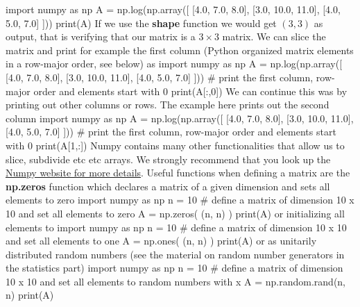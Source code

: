 \documentclass[%
oneside,                 %
final,                   %
10pt]{article}
\begin{document}
\bpycod
import numpy as np
A = np.log(np.array([ [4.0, 7.0, 8.0], [3.0, 10.0, 11.0], [4.0, 5.0, 7.0] ]))
print(A)
\epycod
If we use the \textbf{shape} function we would get $(3, 3)$ as output, that is verifying that our matrix is a $3\times 3$ matrix. We can slice the matrix and print for example the first column (Python organized matrix elements in a row-major order, see below) as
\bpycod
import numpy as np
A = np.log(np.array([ [4.0, 7.0, 8.0], [3.0, 10.0, 11.0], [4.0, 5.0, 7.0] ]))
# print the first column, row-major order and elements start with 0
print(A[:,0]) 
\epycod
We can continue this was by printing out other columns or rows. The example here prints out the second column
\bpycod
import numpy as np
A = np.log(np.array([ [4.0, 7.0, 8.0], [3.0, 10.0, 11.0], [4.0, 5.0, 7.0] ]))
# print the first column, row-major order and elements start with 0
print(A[1,:]) 
\epycod
Numpy contains many other functionalities that allow us to slice, subdivide etc etc arrays. We strongly recommend that you look up the \href{{http://www.numpy.org/}}{Numpy website for more details}. Useful functions when defining a matrix are the \textbf{np.zeros} function which declares a matrix of a given dimension and sets all elements to zero
\bpycod
import numpy as np
n = 10
# define a matrix of dimension 10 x 10 and set all elements to zero
A = np.zeros( (n, n) )
print(A) 
\epycod
or initializing all elements to 
\bpycod
import numpy as np
n = 10
# define a matrix of dimension 10 x 10 and set all elements to one
A = np.ones( (n, n) )
print(A) 
\epycod
or as unitarily distributed random numbers (see the material on random number generators in the statistics part)
\bpycod
import numpy as np
n = 10
# define a matrix of dimension 10 x 10 and set all elements to random numbers with x \in [0, 1]
A = np.random.rand(n, n)
print(A) 
\epycod
\end{document}
